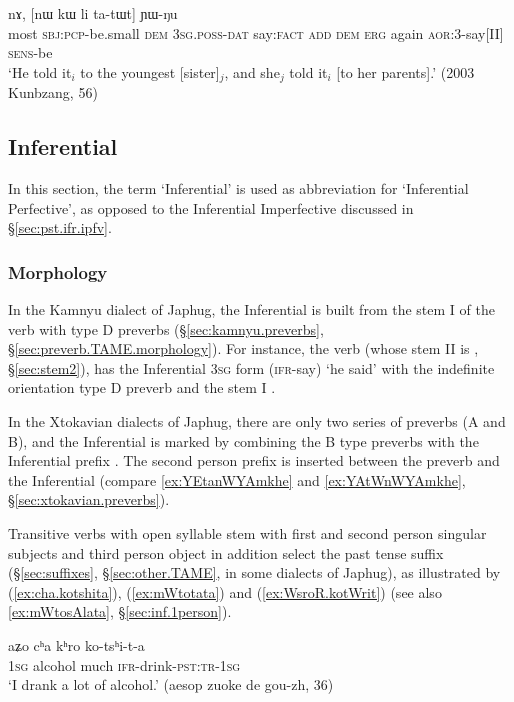 \begin{exe}
\ex \label{ex:ti.nA.tatWt}
 nɤ, [nɯ kɯ li ta-tɯt] ɲɯ-ŋu \\
most \textsc{sbj}:\textsc{pcp}-be.small \textsc{dem} \textsc{3sg}.\textsc{poss}-\textsc{dat} say:\textsc{fact} \textsc{add} \textsc{dem} \textsc{erg} again \textsc{aor}:3\flobv{}-say[II] \textsc{sens}-be \\
\glt `He told it$_i$ to the youngest [sister]$_j$, and she$_j$ told it$_i$ [to her parents].' (2003 Kunbzang, 56)
\end{exe}
 
\subsection{Inferential} \label{sec:ifr}
In this section, the term `Inferential' is used as abbreviation for `Inferential Perfective', as opposed to the Inferential Imperfective discussed in §\ref{sec:pst.ifr.ipfv}.

\subsubsection{Morphology}   \label{sec:ifr.morphology}
In the Kamnyu dialect of Japhug, the Inferential is built from the stem I of the verb with type D preverbs (§\ref{sec:kamnyu.preverbs}, §\ref{sec:preverb.TAME.morphology}). For instance, the verb  (whose stem II is , §\ref{sec:stem2}), has the Inferential \textsc{3sg} form  (\textsc{ifr}-say) `he said' with the indefinite orientation type D preverb  and the stem I .

In the Xtokavian dialects of Japhug, there are only two series of preverbs (A and B), and the Inferential is marked by combining the B type preverbs with the Inferential prefix . The second person prefix  is inserted between the preverb and the Inferential  (compare \ref{ex:YEtanWYAmkhe} and \ref{ex:YAtWnWYAmkhe}, §\ref{sec:xtokavian.preverbs}).

Transitive verbs with open syllable stem with first  and second person singular subjects and third person object in addition select the  past tense suffix (§\ref{sec:suffixes}, §\ref{sec:other.TAME},  in some dialects of Japhug), as illustrated by (\ref{ex:cha.kotshita}), (\ref{ex:mWtotata}) and (\ref{ex:WsroR.kotWrit}) (see also \ref{ex:mWtosAlata}, §\ref{sec:inf.1person}).

\begin{exe}
\ex \label{ex:cha.kotshita}
\gll aʑo cʰa kʰro ko-tsʰi-t-a \\
\textsc{1sg} alcohol much \textsc{ifr}-drink-\textsc{pst}:\textsc{tr}-\textsc{1sg} \\
\glt `I drank a lot of alcohol.' (aesop zuoke de gou-zh, 36)
\end{exe}

